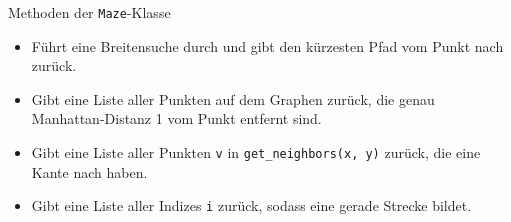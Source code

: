 \documentclass{beamer}
\begin{document}

\begin{frame}[fragile,t]{Methoden der \verb~Maze~-Klasse}
\begin{itemize}
\item {}

\smallskip
Führt eine Breitensuche durch und gibt den kürzesten Pfad vom Punkt  nach  zurück.
\item {}

\smallskip
Gibt eine Liste aller Punkten auf dem Graphen zurück, die genau Manhattan-Distanz 1 vom Punkt  entfernt sind.
\item {}

\smallskip
Gibt eine Liste aller Punkten \verb~v~ in \verb~get_neighbors(x, y)~ zurück, die eine Kante nach  haben.
\item {}
Gibt eine Liste aller Indizes \verb~i~ zurück, sodass  eine gerade Strecke bildet.
\end{itemize}
\end{frame}
\end{document}

